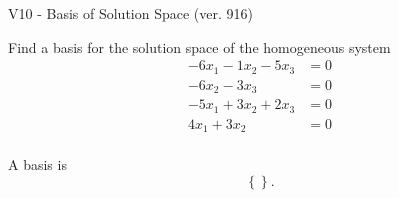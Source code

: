 \begin{exercise}
  \begin{exerciseTitle}V10 - Basis of Solution Space (ver. 916)\end{exerciseTitle}
  \begin{exerciseStatement}
    Find a basis for the solution space of the homogeneous system 
\begin{align*}
 -6 x_ 1 -1 x_ 2 -5 x_ 3 &= 0  \\ 
  -6 x_ 2 -3 x_ 3 &= 0  \\ 
  -5 x_ 1 + 3 x_ 2 + 2 x_ 3 &= 0  \\ 
  4 x_ 1 + 3 x_ 2 &= 0  \\ 
 \end{align*}


 
  \end{exerciseStatement}

  \begin{exerciseAnswer}
   A basis is   
\[\left\{\right\}.\]

  


  \end{exerciseAnswer}
\end{exercise}